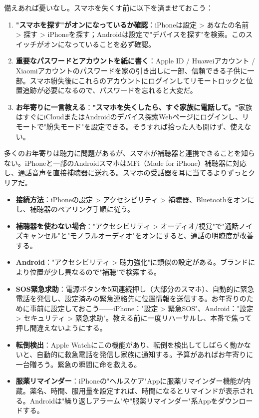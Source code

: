 
備えあれば憂いなし。スマホを失くす前に以下を済ませておこう：

\begin{enumerate}
  \item \textbf{"スマホを探す"がオンになっているか確認}：iPhoneは設定 > あなたの名前 > 探す > iPhoneを探す；Androidは設定で"デバイスを探す"を検索。このスイッチがオンになっていることを必ず確認。
  \item \textbf{重要なパスワードとアカウントを紙に書く}：Apple ID / Huaweiアカウント / Xiaomiアカウントのパスワードを家の引き出しに一部、信頼できる子供に一部。スマホ紛失後にこれらのアカウントにログインしてリモートロックと位置追跡が必要になるので、パスワードを忘れると大変だ。
  \item \textbf{お年寄りに一言教える}：\textbf{"スマホを失くしたら、すぐ家族に電話して。"}家族はすぐにiCloudまたはAndroidのデバイス探索Webページにログインし、リモートで"紛失モード"を設定できる。そうすれば拾った人も開けず、使えない。
\end{enumerate}


多くのお年寄りは聴力に問題があるが、スマホが補聴器と連携できることを知らない。iPhoneと一部のAndroidスマホはMFi（Made for iPhone）補聴器に対応し、通話音声を直接補聴器に送れる。スマホの受話器を耳に当てるよりずっとクリアだ。

\begin{itemize}
  \item \textbf{接続方法}：iPhoneの設定 > アクセシビリティ > 補聴器、Bluetoothをオンにし、補聴器のペアリング手順に従う。
  \item \textbf{補聴器を使わない場合}："アクセシビリティ > オーディオ/視覚"で"通話ノイズキャンセル"と"モノラルオーディオ"をオンにすると、通話の明瞭度が改善する。
  \item \textbf{Android}："アクセシビリティ > 聴力強化"に類似の設定がある。ブランドにより位置が少し異なるので"補聴"で検索する。
\end{itemize}


\begin{itemize}
  \item \textbf{SOS緊急求助}：電源ボタンを5回連続押し（大部分のスマホ）、自動的に緊急電話を発信し、設定済みの緊急連絡先に位置情報を送信する。お年寄りのために事前に設定しておこう——iPhone："設定 > 緊急SOS"、Android："設定 > セキュリティ > 緊急求助"。教える前に一度リハーサルし、本番で焦って押し間違えないようにする。
  \item \textbf{転倒検出}：Apple Watchにこの機能があり、転倒を検出してしばらく動かないと、自動的に救急電話を発信し家族に通知する。予算があればお年寄りに一台贈ろう。緊急の瞬間に命を救える。
  \item \textbf{服薬リマインダー}：iPhoneの"ヘルスケア"Appに服薬リマインダー機能が内蔵。薬名、時間、服用量を設定すれば、時間になるとリマインドが表示される。Androidは"繰り返しアラーム"や"服薬リマインダー"系Appをダウンロードする。
\end{itemize}

